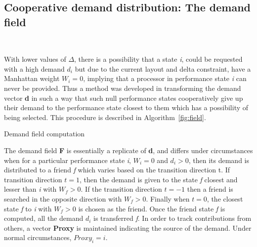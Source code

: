 \subsection{Cooperative demand distribution: The demand field}~\label{sec:field}

With lower values of $\Delta$, there is a possibility that a state \textit{i},
could be requested with a high demand $d_i$ but due to the current layout and 
delta constraint, have a Manhattan weight $W_i = 0$, implying that a processor 
in performance state \textit{i} can never be provided.
Thus a method was developed in transforming the demand vector \textbf{d}
in such a way that such null performance states cooperatively give up their demand
to the performance state closest to them which has a possibility of being selected. 
This procedure is described in Algorithm~\ref{fig:field}.


\begin{algorithm}[h!]
 \SetLine
\caption{Demand field computation}
\label{fig:field}
\end{algorithm}

The demand field \textbf{F} is essentially a replicate of \textbf{d}, and differs under
circumstances when for a particular performance state \textit{i}, $W_i = 0$ and $d_i > 0$,
then its demand is distributed to a friend \textit{f} which varies based on the transition
direction t. If transition direction $t = 1$, then the demand is given to the state \textit{f} closest and lesser than
\textit{i} with $W_f > 0$. If the transition direction $t = -1$ then a friend is searched in 
the opposite direction with $W_f > 0$. Finally when $t = 0$, the closest state \textit{f} to \textit{i} with $W_f > 0$ is chosen as the 
friend. Once the friend state \textit{f} is computed, all the demand $d_i$ is transferred \textit{f}.
In order to track contributions from others, a vector \textbf{Proxy} is maintained indicating 
the source of the demand. Under normal circumstances, $Proxy_i = i$. 


